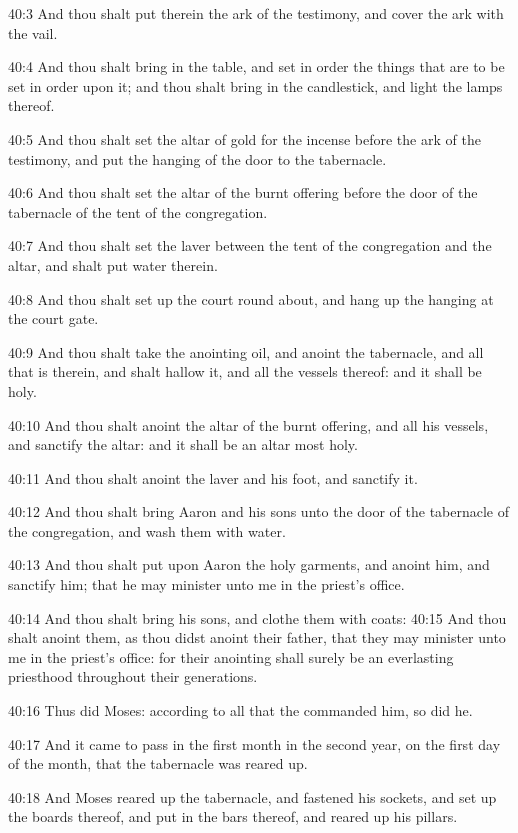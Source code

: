 40:3 And thou shalt put therein the ark of the testimony, and cover
the ark with the vail.

40:4 And thou shalt bring in the table, and set in order the things
that are to be set in order upon it; and thou shalt bring in the
candlestick, and light the lamps thereof.

40:5 And thou shalt set the altar of gold for the incense before the
ark of the testimony, and put the hanging of the door to the
tabernacle.

40:6 And thou shalt set the altar of the burnt offering before the
door of the tabernacle of the tent of the congregation.

40:7 And thou shalt set the laver between the tent of the congregation
and the altar, and shalt put water therein.

40:8 And thou shalt set up the court round about, and hang up the
hanging at the court gate.

40:9 And thou shalt take the anointing oil, and anoint the tabernacle,
and all that is therein, and shalt hallow it, and all the vessels
thereof: and it shall be holy.

40:10 And thou shalt anoint the altar of the burnt offering, and all
his vessels, and sanctify the altar: and it shall be an altar most
holy.

40:11 And thou shalt anoint the laver and his foot, and sanctify it.

40:12 And thou shalt bring Aaron and his sons unto the door of the
tabernacle of the congregation, and wash them with water.

40:13 And thou shalt put upon Aaron the holy garments, and anoint him,
and sanctify him; that he may minister unto me in the priest's office.

40:14 And thou shalt bring his sons, and clothe them with coats: 40:15
And thou shalt anoint them, as thou didst anoint their father, that
they may minister unto me in the priest's office: for their anointing
shall surely be an everlasting priesthood throughout their
generations.

40:16 Thus did Moses: according to all that the \LORD commanded him, so
did he.

40:17 And it came to pass in the first month in the second year, on
the first day of the month, that the tabernacle was reared up.

40:18 And Moses reared up the tabernacle, and fastened his sockets,
and set up the boards thereof, and put in the bars thereof, and reared
up his pillars.

